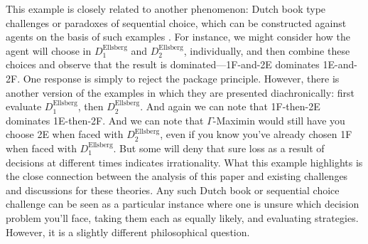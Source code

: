 \documentclass[a4paper]{article}
\newenvironment{CCM rewritten}
{\begingroup\color{blue}} %
{\endgroup}              %
\begin{document}
	This example is closely related to another phenomenon: Dutch book type challenges or paradoxes of sequential choice, which can be constructed against agents on the basis of such examples \citep{seidenfeld2004contrast,elga2010sp}. 
	For instance, we might consider how the agent will choose in $D^{\mathrm{Ellsberg}}_1$ and $D^{\mathrm{Ellsberg}}_2$, individually, and then combine these choices and observe that the result is dominated---1F-and-2E dominates 1E-and-2F. One response is simply to reject the package principle. However, there is another version of the examples in which they are presented diachronically: first evaluate $D^{\mathrm{Ellsberg}}_1$, then $D^{\mathrm{Ellsberg}}_2$. And again we can note that 1F-then-2E dominates 1E-then-2F. And we can note that $\Gamma$-Maximin would still have you choose 2E when faced with $D^{\mathrm{Ellsberg}}_2$, even if you know you've already chosen 1F when faced with $D^{\mathrm{Ellsberg}}_1$. But some will deny that sure loss as a result of decisions at different times indicates irrationality.
		What this example highlights is the close connection between the analysis of this paper and existing challenges and discussions for these theories. Any such Dutch book or sequential choice challenge can be seen as a particular instance where one is unsure which decision problem you'll face, taking them each as equally likely, and evaluating strategies. However, it is a slightly different philosophical question.%

\end{document}
